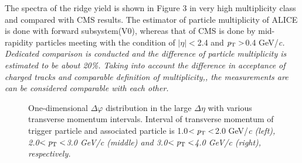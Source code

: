 The spectra of the ridge yield is shown in Figure 3 in very high multiplicity class and compared with CMS results. The estimator of particle multiplicity of ALICE is done with forward subsystem(V0), whereas that of CMS is done by mid-rapidity particles meeting with the condition of $|\eta|<$2.4 and $\it{p}_{\rm{T}}>$0.4 GeV/\it{c}\rm{}. Dedicated comparison is conducted and the difference of particle multiplicity is estimated to be about 20\%. Taking into account the difference in acceptance of charged tracks and comparable definition of multiplicity,, the measurements are can be considered comparable with each other.


\begin{figure}
	\centering
	\caption{ One-dimensional $\Delta\varphi$ distribution in the large $\Delta\eta$ with various transverse momentum intervals. Interval of transverse momentum of trigger particle and associated particle is 1.0$<\it{p}_{\rm{T}}<$2.0 GeV/\it{c}\rm{} (left), 2.0$<\it{p}_{\rm{T}}<$3.0 GeV/\it{c}\rm{} (middle) and 3.0$<\it{p}_{\rm{T}}<$4.0 GeV/\it{c}\rm{} (right), respectively. }

\end{figure}
 
